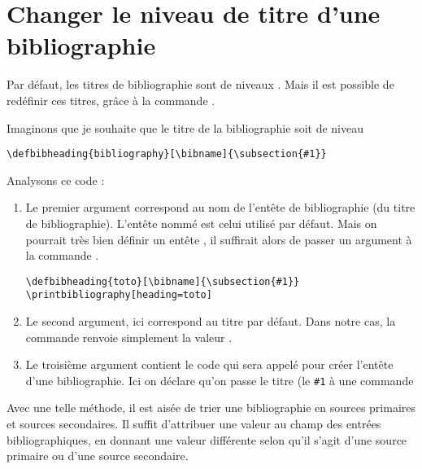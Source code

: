 \section{Changer le niveau de titre d'une bibliographie}

Par défaut, les titres de bibliographie sont de niveaux . Mais il est possible de redéfinir ces titres, grâce à la commande .

Imaginons que je souhaite que le titre de la bibliographie soit de niveau 

\begin{verbatim}
\defbibheading{bibliography}[\bibname]{\subsection{#1}}
\end{verbatim}

Analysons ce code :
\begin{enumerate}
\item Le premier argument correspond au nom de l'entête de bibliographie (du titre de bibliographie). L'entête nommé  est celui utilisé par défaut. Mais on pourrait très bien définir un entête , il suffirait alors de passer un argument  à la commande .

\begin{verbatim}
\defbibheading{toto}[\bibname]{\subsection{#1}}
\printbibliography[heading=toto]
\end{verbatim}

\item Le second argument, ici  correspond au titre par défaut. Dans notre cas, la commande  renvoie simplement la valeur .
\item Le troisième argument contient le code qui sera appelé pour créer l'entête d'une bibliographie. Ici on déclare qu'on passe le titre (le \verb|#1| à une commande 
\end{enumerate}


Avec une telle méthode, il est aisée de trier une bibliographie en sources primaires et sources secondaires. Il suffit d'attribuer une valeur au champ  des entrées bibliographiques, en donnant une valeur différente selon qu'il s'agit d'une source primaire ou d'une source secondaire.

